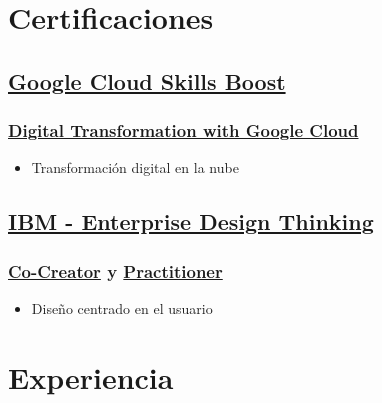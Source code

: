 \documentclass{article}
\begin{document}
\begin{minipage}[t]{0.38\textwidth}
  \section{\faCertificate\enspace Certificaciones}
  
  \subsection{\href{https://www.skills.google/}{Google Cloud Skills Boost}}
  \subsubsection{\href{https://www.skills.google/public_profiles/5107ecc7-7950-485a-a9a3-e58da59e5ba2/badges/6025136?utm_medium=social&utm_source=linkedin&utm_campaign=ql-social-share}{Digital Transformation with Google Cloud}}
  \begin{itemize}
    \item Transformación digital en la nube
  \end{itemize}
  
  \subsection{\href{https://www.ibm.com/training/enterprise-design-thinking}{IBM - Enterprise Design Thinking}}
  \subsubsection{\href{https://www.credly.com/badges/6e2c8272-7f2a-4d66-9e42-541293311a06/linked_in_profile}{Co-Creator} y \href{https://www.credly.com/badges/975e68ee-01a8-49e9-be70-2212f6ae74fe/linked_in_profile}{Practitioner}}
  \begin{itemize}
    \item Diseño centrado en el usuario
  \end{itemize}
\end{minipage}

\section{\faChartPie\enspace Experiencia}
\end{document}
